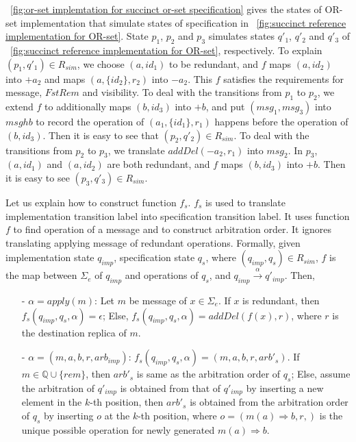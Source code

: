 {\color {red}\figurename~\ref{fig:or-set implemtation for succinct or-set specification} gives the states of OR-set implementation that simulate states of specification in \figurename~\ref{fig:succinct reference implementation for OR-set}. State $p_1$, $p_2$ and $p_3$ simulates states $q'_1$, $q'_2$ and $q'_3$ of \figurename~\ref{fig:succinct reference implementation for OR-set}, respectively. To explain $(p_1,q'_1) \in R_{\mathit{sim}}$, we choose $(a,\mathit{id}_1)$ to be redundant, and $f$ maps $(a,\mathit{id}_2)$ into $+a_2$ and maps $(a,\{ \mathit{id}_2 \},r_2)$ into $-a_2$. This $f$ satisfies the requirements for message, $\mathit{FstRem}$ and visibility. To deal with the transitions from $p_1$ to $p_2$, we extend $f$ to additionally maps $(b,\mathit{id}_3)$ into $+b$, and put $(\mathit{msg}_1,\mathit{msg}_3)$ into $\mathit{msghb}$ to record the operation of $(a_1,\{ \mathit{id}_1 \},r_1)$ happens before the operation of $(b,\mathit{id}_3)$. Then it is easy to see that $(p_2,q'_2) \in R_{\mathit{sim}}$. To deal with the transitions from $p_2$ to $p_3$, we translate $\mathit{addDel}(-a_2,r_1)$ into $\mathit{msg}_2$. In $p_3$, $(a,\mathit{id}_1)$ and $(a,\mathit{id}_2)$ are both redundant, and $f$ maps $(b,\mathit{id}_3)$ into $+b$. Then it is easy to see $(p_3,q'_3) \in R_{\mathit{sim}}$. 

Let us explain how to construct function $f_s$. $f_s$ is used to translate implementation transition label into specification transition label. It uses function $f$ to find operation of a message and to construct arbitration order. It ignores translating applying message of redundant operations. Formally, given implementation state $q_{\mathit{imp}}$, specification state $q_s$, where $(q_{\mathit{imp}},q_s) \in R_{\mathit{sim}}$, $f$ is the map between $\Sigma_e$ of $q_{\mathit{imp}}$ and operations of $q_s$, and $q_{\mathit{imp}} {\xrightarrow{\alpha}} q'_{\mathit{imp}}$. Then,

\begin{itemize}
\setlength{\itemsep}{0.5pt}
\item[-] $\alpha = apply(m)$: Let $m$ be message of $x \in \Sigma_e$. If $x$ is redundant, then $f_s(q_{\mathit{imp}},q_s,\alpha) = \epsilon$; Else, $f_s(q_{\mathit{imp}},q_s,\alpha) = addDel(f(x),r)$, where $r$ is the destination replica of $m$. 

\item[-] $\alpha = (m,a,b,r,\mathit{arb}_{\mathit{imp}})$: $f_s(q_{\mathit{imp}},q_s,\alpha) = (m,a,b,r,\mathit{arb}'_s)$. If $m \in \mathbb{Q} \cup \{ \mathit{rem} \}$, then $\mathit{arb}'_s$ is same as the arbitration order of $q_s$; Else, assume the arbitration of $q'_{\mathit{imp}}$ is obtained from that of $q'_{\mathit{imp}}$ by inserting a new element in the $k$-th position, then $\mathit{arb}'_s$ is obtained from the arbitration order of $q_s$ by inserting $o$ at the $k$-th position, where $o=(m(a)\Rightarrow b,r,)$ is the unique possible operation for newly generated $m(a)\Rightarrow b$. 
\end{itemize}

}
